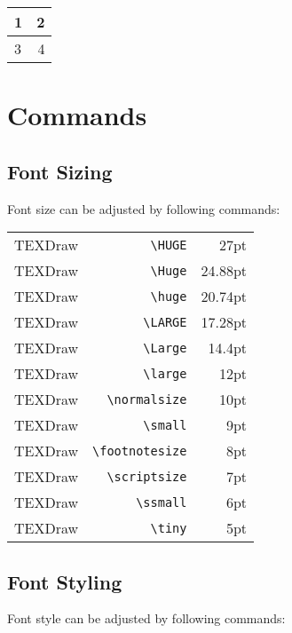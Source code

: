	\begin{center}
		\begin{tabular}{|l|r|} \hline
			1&2\\ \hline
			3&4\\ \hline
		\end{tabular}
	\end{center}

	\section{Commands}

	\subsection{Font Sizing}

	Font size can be adjusted by following commands:

	\begin{center}
		\begin{tabular}{l r r}
			{\HUGE TEXDraw} & \verb|\HUGE| & 27pt \\
			{\Huge TEXDraw} & \verb|\Huge| & 24.88pt \\
			{\huge TEXDraw} & \verb|\huge| & 20.74pt \\
			{\LARGE TEXDraw} & \verb|\LARGE| & 17.28pt \\
			{\Large TEXDraw} & \verb|\Large| & 14.4pt \\
			{\large TEXDraw} & \verb|\large| & 12pt \\
			{\normalsize TEXDraw} & \verb|\normalsize| & 10pt \\
			{\small TEXDraw} & \verb|\small| & 9pt \\
			{\footnotesize TEXDraw} & \verb|\footnotesize| & 8pt \\
			{\scriptsize TEXDraw} & \verb|\scriptsize| & 7pt \\
			{\ssmall TEXDraw} & \verb|\ssmall| & 6pt \\
			{\tiny TEXDraw} & \verb|\tiny| & 5pt \\
		\end{tabular}
	\end{center}

	\subsection{Font Styling}

	Font style can be adjusted by following commands:



